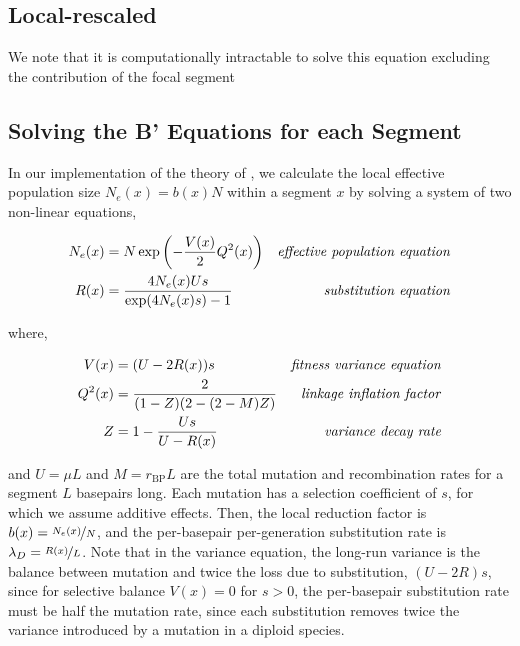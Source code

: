 \documentclass[11pt]{article}
\begin{document}
\subsection*{Local-rescaled }
We note that it is computationally intractable to solve this equation excluding
the contribution of the focal segment 



\subsection*{Solving the B' Equations for each Segment}

In our implementation of the theory of \textcite{Santiago2016-mu}, we calculate
the local effective population size $N_e(x) = b(x) N$ within a segment $x$ by
solving a system of two non-linear equations, 

\begin{align}
  \label{eq:}
  {N}_{e}(x) &= N \exp \left( -\frac{V(x)}{2} Q^2(x) \right) & \text{\emph{effective population equation}} \\
  {R}(x) &= \frac{4N_e(x)U s}{\exp(4 N_e(x) s)-1}  & \text{\emph{substitution equation}} 
\end{align}

where,

\begin{align}
  V(x) &= (U  - 2 {R}(x)) s & \text{\emph{fitness variance equation}} \\
  Q^2(x) &= \frac{2}{(1-Z)(2-(2-M)Z)} & \text{\emph{linkage inflation factor}} \\
  Z &= 1 - \frac{Us}{U-{R(x)}} & \text{\emph{}} \text{\emph{variance decay rate}}
\end{align}

and $U = \mu L$ and $M = r_\text{BP} L$ are the total mutation and
recombination rates for a segment $L$ basepairs long. Each mutation has a
selection coefficient of $s$, for which we assume additive effects. Then, the
local reduction factor is $b(x) = \nicefrac{N_e(x)}{N}$, and the per-basepair
per-generation substitution rate is $\lambda_D = \nicefrac{R(x)}{L}$. Note that
in the variance equation, the long-run variance is the balance between mutation
and twice the loss due to substitution, $(U-2R)s$, since for selective balance
$V(x) = 0$ for $s>0$, the per-basepair substitution rate must be half the mutation rate,
since each substitution removes twice the variance introduced by a mutation in
a diploid species.
\end{document}
